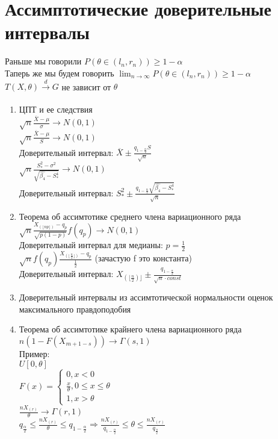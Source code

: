 \documentclass{article}
\newcommand\0{\mathbb{0}}
\newcommand\1{\mathbb{1}}
\newcommand{\xrto}{\xrightarrow}
\newcommand{\Rto}{\Rightarrow}
\begin{document}
\section{Ассимптотические доверительные интервалы}
Раньше мы говорили $P(\theta \in (l_n, r_n)) \geq 1 - \alpha$\\
Таперь же мы будем говорить $\lim_{n \to \infty} P(\theta \in (l_n, r_n)) \geq 1 - \alpha$\\
$T(X, \theta) \xrto[]{d} G$ не зависит от $\theta$\\
\begin{enumerate}
    \item ЦПТ и ее следствия\\
    $\sqrt{n}\frac{\overline{X} - \mu}{\sigma} \to N(0, 1)$\\
    $\sqrt{n}\frac{\overline{X} - \mu}{S} \to N(0, 1)$\\
    Доверительный интервал: $\overline{X} \pm \frac{q_{1 - \frac{\alpha}{2}}S}{\sqrt{n}}$\\
    $\sqrt{n}\frac{S_*^2 - \sigma^2}{\sqrt{\widehat{\beta_4} - S_*^4}} \to N(0, 1)$\\
    Доверительный интервал: $S_*^2 \pm \frac{q_{1 - \frac{\alpha}{2}}\sqrt{\widehat{\beta_4} - S_*^4}}{\sqrt{n}}$
    \item Теорема об ассимтотике среднего члена вариационного ряда\\
    $\sqrt{n}\frac{X_{(\lfloor np \rfloor)} - q_p}{\sqrt{p(1 - p)}} f(q_p) \to N(0, 1)$\\
    Доверительный интервал для медианы: $p = \frac{1}{2}$\\
    $\sqrt{n}f(q_p)\frac{X_{(\lfloor \frac{n}{2} \rfloor)} - q_p}{\frac{1}{2}}$ (зачастую f это константа)\\
    Доверительный интервал: $X_{(\lfloor \frac{n}{2}) \rfloor} \pm \frac{q_{1 - \frac{\alpha}{2}}}{\sqrt{n} \cdot const}$\\
    \item Доверительный интервалы из ассимтотической нормальности оценок максимального правдоподобия\\
    \item Теорема об ассимтотике крайнего члена вариационного ряда\\
    $n(1 - F(X_{m + 1 - s})) \to \Gamma(s, 1)$\\
    Пример:\\
    $U[0, \theta]$\\
    $F(x) = \begin{cases}
        0, x < 0\\
        \frac{x}{\theta}, 0 \leq x \leq \theta\\
        1, x > \theta
    \end{cases}$\\
    $\frac{nX_{(r)}}{\theta} \to \Gamma(r, 1)$\\
    $q_{\frac{\alpha}{2}} \leq \frac{nX_{(r)}}{\theta} \leq q_{1 - \frac{\alpha}{2}} \Rto \frac{nX_{(r)}}{q_{1 - \frac{\alpha}{2}}} \leq \theta \leq \frac{nX_{(r)}}{q_{\frac{\alpha}{2}}}$
\end{enumerate}
\end{document}

